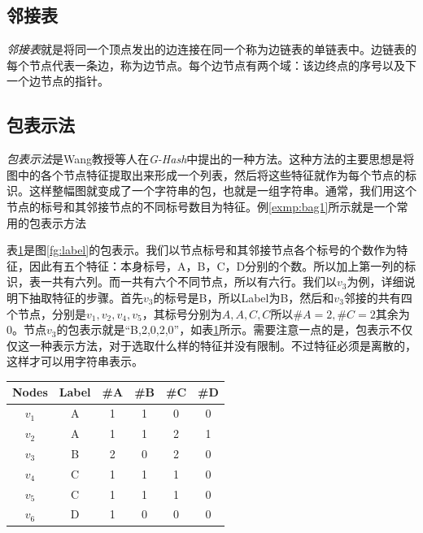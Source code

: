 \documentclass{XDBAthesis}
\begin{document}

\subsection{邻接表}
    \emph{邻接表}\cite{GraphAlgorithm}就是将同一个顶点发出的边连接在同一个称为边链表的单链表中。边链表的每个节点代表一条边，称为边节点。每个边节点有两个域：该边终点的序号以及下一个边节点的指针。
    
\subsection{包表示法}
\emph{包表示法}是Wang教授等人在\emph{G-Hash}\cite{ghash}中提出的一种方法。这种方法的主要思想是将图中的各个节点特征提取出来形成一个列表，然后将这些特征就作为每个节点的标识。这样整幅图就变成了一个字符串的包，也就是一组字符串。通常，我们用这个节点的标号和其邻接节点的不同标号数目为特征。例\ref{exmp:bag1}所示就是一个常用的包表示方法
\begin{exmp}
    表\ref{tb:bagr1}是图\ref{fg:label}的包表示。我们以节点标号和其邻接节点各个标号的个数作为特征，因此有五个特征：本身标号，A，B，C，D分别的个数。所以加上第一列的标识，表一共有六列。而一共有六个不同节点，所以有六行。我们以$v_3 $为例，详细说明下抽取特征的步骤。首先$v_3 $的标号是B，所以Label为B，然后和$v_3$邻接的共有四个节点，分别是$v_1 ,v_2 ,v_4 ,v_5 $，其标号分别为$A,A,C,C$所以$\#A=2,\#C=2$其余为0。节点$v_3 $的包表示就是“B,2,0,2,0”，如表\ref{tb:bagr1}所示。需要注意一点的是，包表示不仅仅这一种表示方法，对于选取什么样的特征并没有限制。不过特征必须是离散的，这样才可以用字符串表示。
    \label{exmp:bag1}
\end{exmp}


\begin{table}[htb]
    \centering
    \begin{tabular}{c|c|c|c|c|c}
        Nodes & Label & \#A & \#B & \#C & \#D \\ \hline
        $v_1$ & A & 1 & 1 & 0 & 0 \\ \hline
        $v_2$ & A & 1 & 1 & 2 & 1 \\ \hline
        $v_3$ & B & 2 & 0 & 2 & 0 \\ \hline
        $v_4$ & C & 1 & 1 & 1 & 0 \\ \hline
        $v_5$ & C & 1 & 1 & 1 & 0 \\ \hline
        $v_6$ & D & 1 & 0 & 0 & 0 \\ \hline
    \end{tabular}
    \label{tb:bagr1}
\end{table}
    
\end{document}
